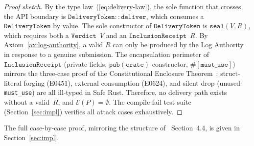 \begin{proof}[Proof sketch]
By the type law~(\ref{eq:delivery-law}), the sole function that crosses the
API boundary is $\mathtt{DeliveryToken{::}deliver}$, which consumes a
$\mathtt{DeliveryToken}$ by value. The sole constructor of
$\mathtt{DeliveryToken}$ is $\mathtt{seal}(V, R)$, which requires both a
$\mathtt{Verdict}$~$V$ and an $\mathtt{InclusionReceipt}$~$R$.
By Axiom~\ref{ax:log-authority}, a valid $R$ can only be produced by the Log
Authority in response to a genuine submission. The encapsulation perimeter of
$\mathtt{InclusionReceipt}$ (private fields, $\mathtt{pub(crate)}$ constructor,
$\mathtt{\#[must\_use]}$) mirrors the three-case proof of the Constitutional
Enclosure Theorem~\cite{btv2026}: struct-literal forging (E0451), external
consumption (E0624), and silent drop (unused-\texttt{must\_use}) are all
ill-typed in Safe Rust. Therefore, no delivery path exists without a valid~$R$,
and $\mathcal{E}(P) = \emptyset$. The compile-fail test suite
(Section~\ref{sec:impl}) verifies all attack cases exhaustively.
\end{proof}

The full case-by-case proof, mirroring the structure of~\cite{btv2026}
Section~4.4, is given in Section~\ref{sec:impl}.
